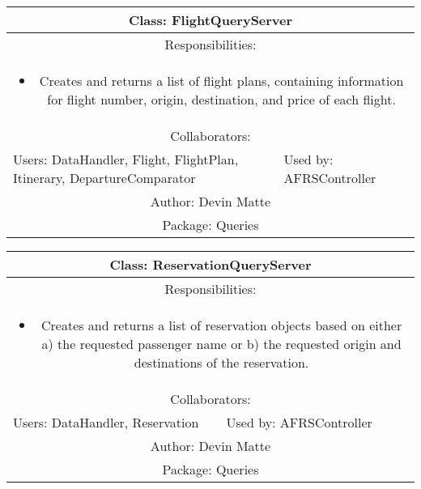 \begin{center}
    \begin{tabular}{ |p{7cm}|p{7cm}|  }
        \hline
        \multicolumn{2}{|c|}{Class: FlightQueryServer} \\
        \hline
        \multicolumn{2}{|c|}{Responsibilities:} \\ \multicolumn{2}{|c|}{\parbox{0.9\textwidth}{
        \begin{itemize}
            \item Creates and returns a list of flight plans, containing information for flight number, origin, destination, and price of each flight.
        \end{itemize} }} \\
        \hline
        \multicolumn{2}{|c|}{Collaborators:} \\
        \hline
        Users: DataHandler, Flight, FlightPlan, Itinerary, DepartureComparator & Used by: AFRSController \\
        \hline
        \multicolumn{2}{|c|}{Author: Devin Matte} \\
        \hline
        \multicolumn{2}{|c|}{Package: Queries} \\
        \hline
    \end{tabular}
\end{center}

\begin{center}
    \begin{tabular}{ |p{7cm}|p{7cm}|  }
        \hline
        \multicolumn{2}{|c|}{Class: ReservationQueryServer} \\
        \hline
        \multicolumn{2}{|c|}{Responsibilities:} \\ \multicolumn{2}{|c|}{\parbox{0.9\textwidth}{
        \begin{itemize}
            \item Creates and returns a list of reservation objects based on either a) the requested passenger name or b) the requested origin and destinations of the reservation.
        \end{itemize} }} \\
        \hline
        \multicolumn{2}{|c|}{Collaborators:} \\
        \hline
        Users: DataHandler, Reservation & Used by: AFRSController \\
        \hline
        \multicolumn{2}{|c|}{Author: Devin Matte} \\
        \hline
        \multicolumn{2}{|c|}{Package: Queries} \\
        \hline
    \end{tabular}
\end{center}


